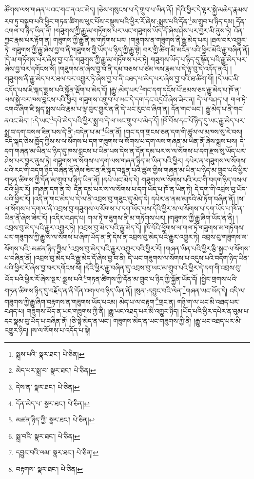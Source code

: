 ཚོགས་ལས་གཞན་པའང་གང་ནའང་མེད། །ཅེས་གསུངས་པ་དེ་གྲུབ་པ་ཡིན་ནོ། །དེའི་ཕྱིར་དེ་ལྟར་སྐྱེ་མཆེད་རྣམས་རབ་ཏུ་བསྒྲུབ་པའི་ཕྱིར་གཏན་ཚིགས་ཕུང་པོས་བསྡུས་པའི་ཕྱིར་རོ་ཞེས་:སྨྲས་པའི་དོན་\footnote{སྨྲས་པའི་  སྣར་ཐང་།  པེ་ཅིན། }མ་གྲུབ་པ་ཉིད་དམ། དོན་འགལ་བ་ཉིད་ཡིན་ནོ། །གཟུགས་ཀྱི་རྒྱུ་མ་གཏོགས་པར་ཡང་གཟུགས་ཡོད་དོ་ཞེས་ཤེས་པར་བྱར་མི་ནུས་ཏེ། འོན་ཀྱང་རྣམ་པར་རྟོག་ན། གཟུགས་ཀྱི་རྒྱུ་ནི་མ་གཏོགས་པར། །གཟུགས་ན་གཟུགས་ནི་རྒྱུ་མེད་པར། །ཐལ་བར་འགྱུར་ཏེ། གཟུགས་ཀྱི་རྒྱུ་ཞེས་བྱ་བ་ནི་གཟུགས་ཀྱི་ཡོད་པ་ཉིད་ཀྱི་རྒྱུ་སྟེ། བར་གྱི་ཚིག་མི་མངོན་པའི་ཕྱིར་མེའི་རྒྱུ་བཞིན་ནོ། །དེ་མ་གཏོགས་པར་ཞེས་བྱ་བ་ནི་གཟུགས་ཀྱི་རྒྱུ་མ་གཏོགས་པར་ཏེ། གཟུགས་ཡོད་པ་ཉིད་དུ་སྟོན་པའི་རྒྱུ་མེད་པར་ཞེས་བྱ་བར་དགོངས་སོ། །གཟུགས་ན་ཞེས་བྱ་བ་ནི་དམ་བཅས་པ་ཙམ་ལས་རྣམ་པ་དེ་ལྟ་བུ་དེ་འདོད་ནའོ། །གཟུགས་ནི་རྒྱུ་མེད་པར་ཐལ་བར་འགྱུར་ཏེ་ཞེས་བྱ་བ་ནི་འཐད་པ་མེད་པར་ཞེས་བྱ་བའི་ཐ་ཚིག་གོ། །དེ་ཡང་མི་འདོད་པས་ཇི་སྐད་སྨྲས་པའི་སྐྱོན་ལྡོག་པ་མེད་དོ། །རྒྱུ་:མེད་པར་\footnote{མེད་པར་སྨྲ་བ་  སྣར་ཐང་།  པེ་ཅིན། }གང་དག་དངོས་པོ་ཐམས་ཅད་རྒྱུ་མེད་པ་ཁོ་ན་ལས་སྐྱེ་བར་ཁས་བླངས་པའི་ཕྱིར། གཟུགས་འགྲུབ་པ་ཡང་དེ་དག་དང་འདྲའོ་ཞེས་ཟེར་ན། དེ་ལ་བཤད་པ། གལ་ཏེ་འགའ་ཞིག་ཇི་སྐད་སྨྲས་པའི་རྣམ་པ་ལྟ་བུར་གྱུར་ན་ནི་དེ་ཡང་རུང་བ་ཞིག་ན། དོན་གང་ཡང་། རྒྱུ་མེད་པ་ནི་གང་ནའང་མེད། །:དེ་ཡང་\footnote{དེས་ན་  སྣར་ཐང་།  པེ་ཅིན། }དཔེ་མེད་པའི་ཕྱིར་སྨྲ་བ་དེ་ལ་ཡང་གྲུབ་པ་མེད་དོ། །ཁོ་བོས་དང་པོ་ཉིད་དུ་ཡང་རྒྱུ་མེད་པར་སྨྲ་བ་དག་བསལ་ཟིན་པས་དེ་ནི་:བདེན་པ་མ་\footnote{དོན་མེད་པ་  སྣར་ཐང་།  པེ་ཅིན། }ཡིན་ནོ། །གང་དག་གྲངས་ཅན་དག་གི་ཚུལ་ལ་མཁས་སུ་རེ་བས། འདི་སྐད་ཅེས་ཁྱོད་ཀྱིས་ས་ལ་སོགས་པ་དག་གཟུགས་ལ་སོགས་པ་དག་ལས་གཞན་མ་ཡིན་ནོ་ཞེས་སྨྲས་པས། དེ་དག་གཞན་མ་ཡིན་པ་ཉིད་དུ་ཁས་བླངས་པ་ཡིན་པས་དེས་ན་དོན་དམ་པར་ས་ལ་སོགས་པ་དག་རྫས་སུ་ཡོད་པར་ཤེས་པར་བྱར་ནུས་ཏེ། གཟུགས་ལ་སོགས་པ་དག་ལས་གཞན་ཉིད་མ་ཡིན་པའི་ཕྱིར། དཔེར་ན་གཟུགས་ལ་སོགས་པའི་རང་གི་བདག་ཉིད་བཞིན་ནོ་ཞེས་ཟེར་ན་ཇི་སྐད་བསྟན་པའི་ཚུལ་གྱིས་གཞན་མ་ཡིན་པ་ཉིད་མ་གྲུབ་པའི་ཕྱིར་གཏན་ཚིགས་ཀྱི་དོན་མ་གྲུབ་པ་ཉིད་ཡིན་ནོ། །དཔེ་ཡང་མེད་དེ། གཟུགས་ལ་སོགས་པའི་རང་གི་བདག་ཉིད་བསལ་བའི་ཕྱིར་རོ། །གཞན་དག་ན་རེ། དོན་དམ་པར་ས་ལ་སོགས་པ་དག་ཡོད་པ་ཁོ་ན་ཡིན་ཏེ། དེ་དག་གི་འབྲས་བུ་ཡོད་པའི་ཕྱིར་རོ། །འདི་ན་གང་མེད་པ་དེ་ལ་ནི་འབྲས་བུ་གཟུང་དུ་མེད་དེ། དཔེར་ན་ནམ་མཁའི་མེ་ཏོག་བཞིན་ནོ། །ས་ལ་སོགས་པ་དག་ལ་ནི་འབྲས་བུ་གཟུགས་ལ་སོགས་པ་དག་ཡོད་པས་དེའི་ཕྱིར་ས་ལ་སོགས་པ་དག་ཡོད་པ་ཁོ་ན་ཡིན་ནོ་ཞེས་ཟེར་རོ། །འདིར་བཤད་པ། གལ་ཏེ་གཟུགས་ནི་མ་གཏོགས་པར། །གཟུགས་ཀྱི་རྒྱུ་ཞིག་ཡོད་ན་ནི། །འབྲས་བུ་མེད་པའི་རྒྱུར་འགྱུར་ཏེ། །འབྲས་བུ་མེད་པའི་རྒྱུ་མེད་དོ། །ཁོ་བོའི་ཕྱོགས་ལ་གལ་ཏེ་གཟུགས་མ་གཏོགས་པར་གཟུགས་ཀྱི་རྒྱུ་ས་ལ་སོགས་པ་ཞིག་ཡོད་ན་ནི་དེས་ན་འབྲས་བུ་མེད་པའི་རྒྱུར་འགྱུར་ཏེ། འབྲས་བུ་གཟུགས་ལ་སོགས་པའི་:མཚན་ཉིད་ཀྱིས་\footnote{མཚན་ཉིད་ཀྱི་  སྣར་ཐང་།  པེ་ཅིན། }འབྲས་བུ་མེད་པའི་རྒྱུར་འགྱུར་བའི་ཕྱིར་རོ། །གཞན་ཡིན་པའི་ཕྱིར་རྩི་སྐྱང་ལ་སོགས་པ་བཞིན་ནོ། །འབྲས་བུ་མེད་པའི་རྒྱུ་མེད་དོ་ཞེས་བྱ་བ་ནི། དེ་ཡང་གཟུགས་ལ་སོགས་པ་འདུས་པའི་བདག་ཉིད་ཡིན་པའི་ཕྱིར་རོ་ཞེས་བྱ་བར་དགོངས་སོ། །དེའི་ཕྱིར་རྒྱུ་བཞིན་དུ་འབྲས་བུ་ཡང་མ་གྲུབ་པའི་ཕྱིར་དེ་དག་གི་འབྲས་བུ་ཡོད་པའི་ཕྱིར་རོ་ཞེས་སྔར་:སྨྲས་པའི་\footnote{སྨྲ་བའི་  སྣར་ཐང་།  པེ་ཅིན། }གཏན་ཚིགས་ཀྱི་དོན་མ་གྲུབ་པ་ཉིད་ཀྱི་སྐྱོན་ཡོད་དོ། །སྤྱིར་གྲགས་པའི་གཏན་ཚིགས་ཉིད་དུ་བརྗོད་ན་ནི་དོན་འགལ་བ་ཉིད་ཡིན་ནོ། །སུན་:དབྱུང་བའི་ལེན་\footnote{དབྱུང་བའི་ལམ་  སྣར་ཐང་།  པེ་ཅིན། }གཞན་ཡང་ཡོད་དེ། འདི་ལ་གཟུགས་ཀྱི་རྒྱུ་ཞིག་བརྟགས་ན་གཟུགས་ཡོད་པའམ། མེད་པ་ལ་བརྟག་\footnote{བརྟགས་  སྣར་ཐང་།  པེ་ཅིན། }གྲང་ན། གཉི་ག་ལ་ཡང་མི་འཐད་པར་བཤད་པ། གཟུགས་ཡོད་ན་ཡང་གཟུགས་ཀྱི་ནི། །རྒྱུ་ཡང་འཐད་པར་མི་འགྱུར་ཉིད། །ཡོད་པའི་ཕྱིར་དཔེར་ན་བུམ་པ་དང་སྣམ་བུ་ཡོད་པ་བཞིན་ནོ། །ཅི་སྟེ་མེད་ན་ཡང་། གཟུགས་མེད་ན་ཡང་གཟུགས་ཀྱི་ནི། །རྒྱུ་ཡང་འཐད་པར་མི་འགྱུར་ཉིད། །ས་ལ་སོགས་པ་འདོད་པ་སྟེ། 